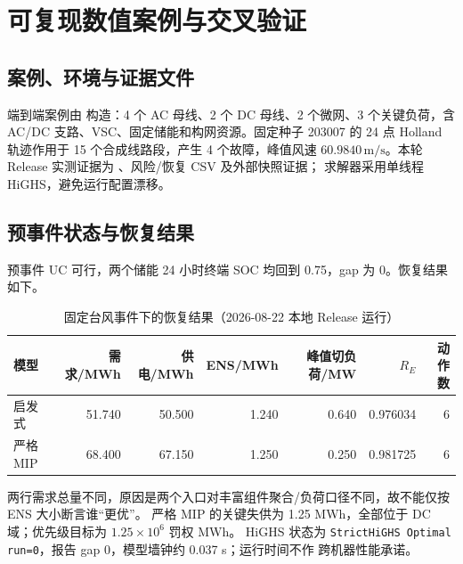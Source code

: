 \section{可复现数值案例与交叉验证}\label{sec:res-numerical}

\subsection{案例、环境与证据文件}
端到端案例由  构造：4 个 AC 母线、2 个 DC
母线、2 个微网、3 个关键负荷，含 AC/DC 支路、VSC、固定储能和构网资源。固定种子 203007 的
24 点 Holland 轨迹作用于 15 个合成线路段，产生 4 个故障，峰值风速
$60.9840\,\mathrm{m/s}$。本轮 Release 实测证据为
、风险/恢复 CSV 及外部快照证据；
求解器采用单线程 HiGHS，避免运行配置漂移。

\subsection{预事件状态与恢复结果}
预事件 UC 可行，两个储能 24 小时终端 SOC 均回到 0.75，gap 为 0。恢复结果如下。
\begin{table}[H]\centering\small
\caption{固定台风事件下的恢复结果（2026-08-22 本地 Release 运行）}
\begin{tabular}{lrrrrrr}
\toprule
模型 & 需求/MWh & 供电/MWh & ENS/MWh & 峰值切负荷/MW & $R_E$ & 动作数\\\midrule
启发式 & 51.740 & 50.500 & 1.240 & 0.640 & 0.976034 & 6\\
严格 MIP & 68.400 & 67.150 & 1.250 & 0.250 & 0.981725 & 6\\
\bottomrule
\end{tabular}
\end{table}
两行需求总量不同，原因是两个入口对丰富组件聚合/负荷口径不同，故不能仅按 ENS 大小断言谁“更优”。
严格 MIP 的关键失供为 1.25 MWh，全部位于 DC 域；优先级目标为 $1.25\times10^6$ 罚权 MWh。
HiGHS 状态为 \texttt{StrictHiGHS Optimal run=0}，报告 gap 0，模型墙钟约 0.037 s；运行时间不作
跨机器性能承诺。

